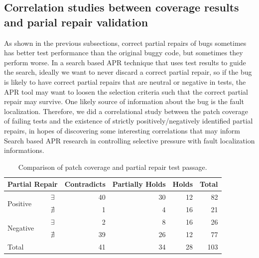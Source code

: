 \documentclass[10pt, conference]{IEEEtran}
\begin{document}
\subsection{Correlation studies between coverage results and parial repair validation}

As shown in the previous subsections, correct partial repairs of bugs sometimes has better test
performance than the original buggy code, but sometimes they perform worse. In a search based APR technique that
uses test results to guide the search, ideally we want to never discard a correct partial repair, so if the bug
is likely to have correct partial repairs that are neutral or negative in tests, the 
APR tool may want to loosen the selection criteria such that the correct partial repair may survive. 
One likely source of information about the bug is the fault localization.
Therefore, we did a
correlational study between the patch coverage of failing tests and the existence of strictly positively/negatively
identified partial repairs, in hopes of discovering some interesting correlations that may inform
Search based APR research in controlling selective pressure with fault localization informations.


\begin{table}
  {\begin{center}
      \begin{tabular} {llrrrr}
        \toprule
        \multicolumn{2}{c}{Partial Repair} & Contradicts & Partially Holds & Holds & Total \\
        \midrule
        \multirow{2}{*}{Positive} & $\exists$  & 40 & 30 & 12 &  82 \\
                                  & $\nexists$ &  1 &  4 & 16 &  21 \\
        \midrule
        \multirow{2}{*}{Negative} & $\exists$  &  2 &  8 & 16 &  26 \\
                                  & $\nexists$ & 39 & 26 & 12 &  77 \\
        \midrule
        Total                     &            & 41 & 34 & 28 & 103 \\
        \bottomrule
      \end{tabular}
    \end{center}
  }
  \caption{Comparison of patch coverage and partial repair test passage.}
  \label{tab:cov_fitness}
\end{table}
\end{document}
